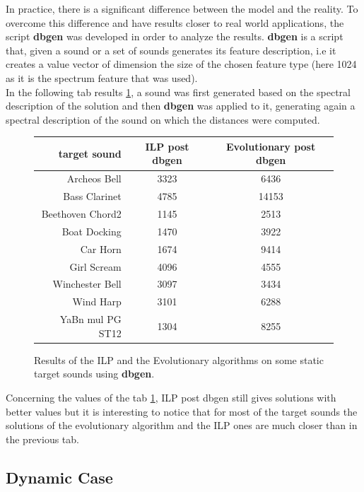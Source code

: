 \documentclass[a4paper]{book}
\begin{document}
In practice, there is a significant difference between the model and the reality. To overcome this difference and have results closer to real world applications, the script \textbf{dbgen} was developed in order to analyze the results. \textbf{dbgen} is a script that, given a sound or a set of sounds generates its feature description, i.e it creates a value vector of dimension the size of the chosen feature type (here 1024 as it is the spectrum feature that was used). \\
In the following tab results \ref{tab:resultstat2}, a sound was first generated based on the spectral description of the solution and then \textbf{dbgen} was applied to it, generating again a spectral description of the sound on which the distances were computed. \\
\begin{figure}[ht!]
\begin{center}
    

\begin{tabular}{r||c|c}%
     \textbf{target sound}&\textbf{ILP post dbgen}&\textbf{Evolutionary post dbgen}  \\
    \hline
     Archeos Bell&3323&6436\\
Bass Clarinet&4785&14153\\
Beethoven Chord2&1145&2513\\
Boat Docking&1470&3922\\
Car Horn&1674&9414\\
Girl Scream&4096&4555\\
Winchester Bell&3097&3434\\
Wind Harp&3101&6288\\
YaBn mul PG ST12&1304&8255
 
\end{tabular}
\caption{Results of the ILP and the Evolutionary algorithms on some static target sounds using \textbf{dbgen}.}
\label{tab:resultstat2}
\end{center}
\end{figure}

Concerning the values of the tab \ref{tab:resultstat2}, ILP post dbgen still gives solutions with better values but it is interesting to notice that for most of the target sounds the solutions of the evolutionary algorithm and the ILP ones are much closer than in the previous tab.


\subsection{Dynamic Case}\label{sec:expdyn}
\end{document}
